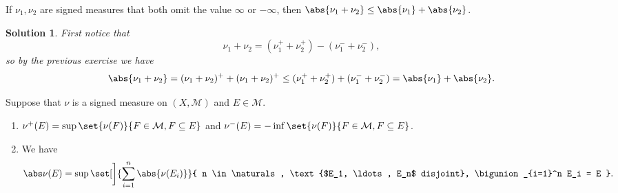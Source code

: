 \documentclass[article, a4paper, 11pt, oneside]{memoir}
\numberwithin{equation}{chapter}
\newcommand{\calM}{\mathcal{M}}
\theoremstyle{nonumberplain}
\newtheorem{solution}{Solution}
\begin{document}
\begin{exerciseframed*}[5]
	If $\nu_1, \nu_2$ are signed measures that both omit the value $\infty$ or $-\infty$, then $\abs{\nu_1 + \nu_2} \leq \abs{\nu_1} + \abs{\nu_2}$.
\end{exerciseframed*}

\begin{solution}
	First notice that
	\begin{equation*}
		\nu_1 + \nu_2
			= (\nu_1^+ + \nu_2^+) - (\nu_1^- + \nu_2^-),
	\end{equation*}
	so by the previous exercise we have
	\begin{equation*}
		\abs{\nu_1 + \nu_2}
			= (\nu_1 + \nu_2)^+ + (\nu_1 + \nu_2)^+
			\leq (\nu_1^+ + \nu_2^+) + (\nu_1^- + \nu_2^-)
			= \abs{\nu_1} + \abs{\nu_2}.
	\end{equation*}
\end{solution}


\begin{exerciseframed*}[7]
	Suppose that $\nu$ is a signed measure on $(X,\calM)$ and $E \in \calM$.
	\begin{enumerate}
		\item $\nu^+(E) = \sup\set{\nu(F)}{F \in \calM, F \subseteq E}$ and $\nu^-(E) = -\inf\set{\nu(F)}{F \in \calM, F \subseteq E}$.

		\item We have
		\begin{equation*}
			\abs\nu(E)
				= \sup\set[\bigg]{ \sum_{i=1}^n \abs{\nu(E_i)} }
				        { n \in \naturals, \text{$E_1, \ldots, E_n$ disjoint}, \bigunion_{i=1}^n E_i = E }.
		\end{equation*}
	\end{enumerate}
\end{exerciseframed*}
\end{document}
